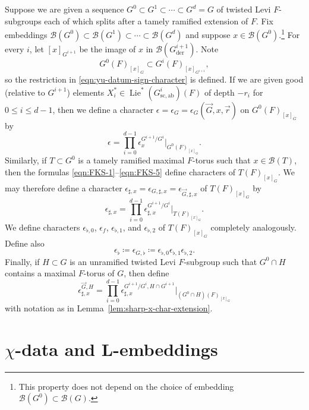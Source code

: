 \documentclass[reqno]{amsart}
\numberwithin{equation}{subsection}
\newcommand\cB{\mathcal{B}}
\DeclareMathOperator{\Lie}{Lie}
\DeclareMathOperator{\der}{der}
\theoremstyle{remark}
\numberwithin{equation}{subsection}
\numberwithin{figure}{subsection}
\begin{document}
Suppose we are given a sequence $G^0 \subset G^1 \subset \cdots \subset G^d = G$ of twisted Levi $F$-subgroups each of which splits after a tamely ramified extension of $F$. Fix embeddings $\cB(G^0) \subset \cB(G^1) \subset \cdots \subset \cB(G^d)$ and suppose $x \in \cB(G^0)$.\footnote{This property does not depend on the choice of embedding $\cB(G^0) \subset \cB(G)$.}
For every $i$, let $[x]_{G^{i+1}}$ be the image of $x$ in $\cB(G^{i+1}_{\der})$. Note
\[
G^0(F)_{[x]_G}\subset G^i(F)_{[x]_{G^{i+1}}},
\]
so the restriction in \eqref{eqn:yu-datum-sign-character} is defined.
If we are given good (relative to $G^{i+1}$) elements $X_i^* \in \Lie^*(G^i_{\mathrm{sc,ab}})(F)$ of depth $-r_i$ for $0 \leq i \leq d-1$, then we define a character $\epsilon = \epsilon_G = \epsilon_G(\vec{G}, x, \vec{r})$ on $G^0(F)_{[x]_G}$ by
\begin{equation}\label{eqn:yu-datum-sign-character}
\epsilon = \prod_{i=0}^{d-1} \epsilon_x^{G^{i+1}/G^i}|_{G^0(F)_{[x]_G}}.
\end{equation}
Similarly, if $T \subset G^0$ is a tamely ramified maximal $F$-torus such that $x \in \cB(T)$, then the formulas \eqref{eqn:FKS-1}--\eqref{eqn:FKS-5} define characters of $T(F)_{[x]_G}$. We may therefore define a character $\epsilon_{\sharp,x} = \epsilon_{G,\sharp,x} = \epsilon_{\vec{G},\sharp,x}$ of $T(F)_{[x]_G}$ by
\begin{equation}\label{eqn:eps-sharp-x}
\epsilon_{\sharp,x} = \prod_{i=0}^{d-1} \epsilon_{\sharp,x}^{G^{i+1}/G^i}|_{T(F)_{[x]_G}}.
\end{equation}
We define characters $\epsilon_{\flat,0}$, $\epsilon_f$, $\epsilon_{\flat,1}$, and $\epsilon_{\flat,2}$ of $T(F)_{[x]_G}$ completely analogously. Define also
\begin{equation}\label{eqn:eps_flat}
\epsilon_\flat \coloneqq \epsilon_{G,\flat} \coloneqq \epsilon_{\flat,0}\epsilon_{\flat,1}\epsilon_{\flat,2}.
\end{equation}
Finally, if $H \subset G$ is an unramified twisted Levi $F$-subgroup such that $G^0 \cap H$ contains a maximal $F$-torus of $G$, then define
\begin{equation}\label{eqn:sharp-x-difference}
\epsilon_{\sharp,x}^{\vec{G},H} = \prod_{i=0}^{d-1} \epsilon_{\sharp,x}^{G^{i+1}/G^i, H\cap G^{i+1}}|_{(G^0\cap H)(F)_{[x]_G}}
\end{equation}
with notation as in Lemma~\ref{lem:sharp-x-char-extension}.



\section{$\chi$-data and L-embeddings}\label{ss:chi-data-L-embedding}
\end{document}

